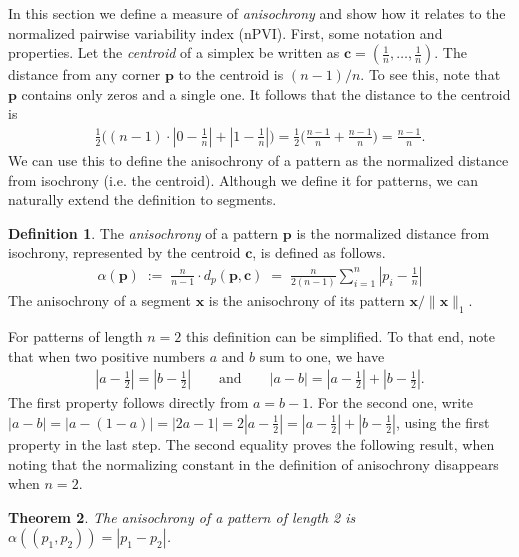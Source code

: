 \documentclass[suppldata]{tMAM2e}%
\newcommand{\vect}[1]{\mathbf{#1}}
\newcommand{\vx}{\vect x}
\newcommand{\vp}{\vect p}
\newcommand{\vc}{\vect c}
\theoremstyle{plain}
\newtheorem{theorem}{Theorem}[section]
\theoremstyle{definition}
\newtheorem{definition}[theorem]{Definition}
\theoremstyle{remark}
\begin{document}
In this section we define a measure of \emph{anisochrony} and show how it relates to the normalized pairwise variability index (nPVI).
First, some notation and properties.
Let the \emph{centroid} of a simplex be written as $\vc = (\tfrac{1}{n}, \dots, \tfrac{1}{n})$.
The distance from any corner $\vp$ to the centroid is $(n-1)/n$. 
To see this, note that $\vp$ contains only zeros and a single one. 
It follows that the distance to the centroid is
\begin{align}
  \tfrac{1}{2}\Big((n-1) \cdot |0 - \tfrac{1}{n}| +
  |1-\tfrac{1}{n}|\Big)
  = \tfrac{1}{2}\Big(\frac{n-1}{n} + \frac{n-1}{n}\Big)
  = \frac{n-1}{n}.
\end{align}
We can use this to define the anisochrony of a pattern as the normalized distance from isochrony (i.e. the centroid). 
Although we define it for patterns, we can naturally extend the definition to segments.


\begin{definition}
  The \emph{anisochrony} of a pattern $\vp$ is the normalized distance from isochrony, represented by the centroid $\vc$, is defined as follows.
  \begin{align}
    \alpha(\vp)
    \; := \; \frac{n}{n-1} \cdot d_p(\vp, \vc)
    \; = \; \frac{n}{2(n-1)} \sum_{i=1}^n |p_i - \tfrac{1}{n}|
  \end{align}
  The anisochrony of a segment $\vx$ is the anisochrony of its pattern $\vx / \|\vx\|_1$.
\end{definition}



For patterns of length $n=2$ this definition can be simplified.
To that end, note that when two positive numbers $a$ and $b$ sum to one, we have
\begin{align}
  |a-\tfrac{1}{2}| = |b-\tfrac{1}{2}|
  \qquad \text{and} \qquad
  |a-b|
  = |a-\tfrac{1}{2}| + |b-\tfrac{1}{2}|.
\end{align}
The first property follows directly from $a=b-1$. 
For the second one, write
$|a-b|
  = |a-(1-a)|
  = |2a-1|
  = 2|a-\tfrac{1}{2}|
  = |a-\tfrac{1}{2}| + |b-\tfrac{1}{2}|
$,
using the first property in the last step.
The second equality proves the following result, when noting that the normalizing constant in the definition of anisochrony disappears when $n=2$.

\begin{theorem}\label{thm:2-anisochrony}
  The anisochrony of a pattern of length 2 is $\alpha((p_1, p_2)) = |p_1 - p_2|$.
\end{theorem}
\end{document}
